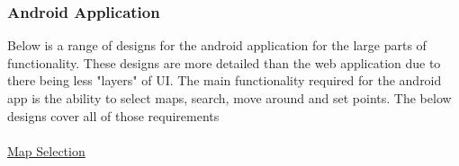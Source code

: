 \subsubsection{Android Application}
Below is a range of designs for the android application for the large parts of functionality. These designs are more detailed than the web application due to there being less "layers" of UI. The main functionality required for the android app is the ability to select maps, search, move around and set points. The below designs cover all of those requirements \\
\\\underline{Map Selection}
\begin{center}

\end{center}
